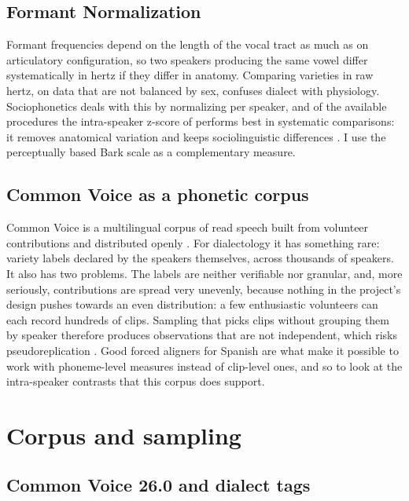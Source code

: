 \documentclass[11pt]{article}
\begin{document}
\subsection{Formant Normalization}
\label{sec:norm}

Formant frequencies depend on the length of the vocal tract as much as on
articulatory configuration, so two speakers producing the same vowel differ
systematically in hertz if they differ in anatomy. Comparing varieties in raw
hertz, on data that are not balanced by sex, confuses dialect with physiology.
Sociophonetics deals with this by normalizing per speaker, and of the available
procedures the intra-speaker z-score of \citet{lobanov1971} performs best in
systematic comparisons: it removes anatomical variation and keeps sociolinguistic
differences \citep{adank2004}. I use the perceptually based Bark scale
\citep{traunmuller1990} as a complementary measure.

\subsection{Common Voice as a phonetic corpus}
\label{sec:corpus}

Common Voice is a multilingual corpus of read speech built from volunteer
contributions and distributed openly \citep{ardila2020}. For dialectology it has
something rare: variety labels declared by the speakers themselves, across
thousands of speakers. It also has two problems. The labels are neither
verifiable nor granular, and, more seriously, contributions are spread very
unevenly, because nothing in the project's design pushes towards an even
distribution: a few enthusiastic volunteers can each record hundreds of clips.
Sampling that picks clips without grouping them by speaker therefore produces
observations that are not independent, which risks pseudoreplication
\citep{hurlbert1984,winter2019}. Good forced aligners for Spanish
\citep{mcauliffe2017} are what make it possible to work with phoneme-level
measures instead of clip-level ones, and so to look at the intra-speaker
contrasts that this corpus does support.

\section{Corpus and sampling}

\subsection{Common Voice 26.0 and dialect tags}
\end{document}
